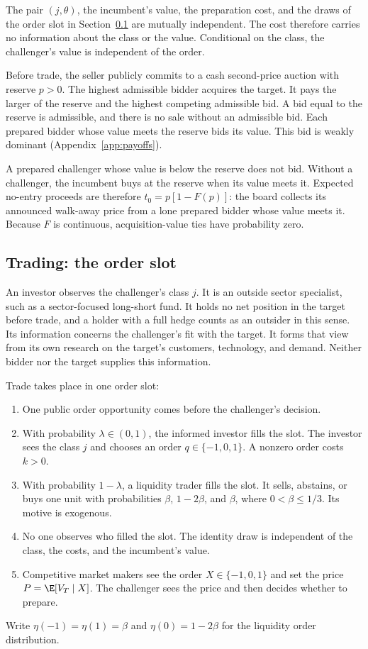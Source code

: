 The pair \((j,\theta)\), the incumbent's value, the preparation cost, and the draws of the order slot in
Section~\ref{sec:slot} are mutually independent. The cost therefore carries no information about the class or
the value. Conditional on the class, the challenger's value is independent of the order.

Before trade, the seller publicly commits to a cash second-price auction with reserve \(p>0\). The highest
admissible bidder acquires the target. It pays the larger of the reserve and the highest competing admissible
bid. A bid equal to the reserve is admissible, and there is no sale without an admissible bid. Each prepared
bidder whose value meets the reserve bids its value. This bid is weakly dominant (Appendix~\ref{app:payoffs}).

A prepared challenger whose value is below the reserve does not bid. Without a challenger, the incumbent buys
at the reserve when its value meets it. Expected no-entry proceeds are therefore \(t_0=p[1-F(p)]\): the board
collects its announced walk-away price from a lone prepared bidder whose value meets it. Because \(F\) is
continuous, acquisition-value ties have probability zero.

\subsection{Trading: the order slot}\label{sec:slot}

An investor observes the challenger's class \(j\). It is an outside sector specialist, such as a
sector-focused long-short fund. It holds no net position in the target before trade, and a holder with a full
hedge counts as an outsider in this sense. Its information concerns the challenger's fit with the target. It
forms that view from its own research on the target's customers, technology, and demand. Neither bidder nor the
target supplies this information.

Trade takes place in one order slot:
\begin{enumerate}[label=(\arabic*),leftmargin=2.5em]
\item One public order opportunity comes before the challenger's decision.
\item With probability \(\lambda\in(0,1)\), the informed investor fills the slot. The investor sees the class
\(j\) and chooses an order \(q\in\{-1,0,1\}\). A nonzero order costs \(k>0\).
\item With probability \(1-\lambda\), a liquidity trader fills the slot. It sells, abstains, or buys one unit
with probabilities \(\beta\), \(1-2\beta\), and \(\beta\), where \(0<\beta\le1/3\). Its motive is exogenous.
\item No one observes who filled the slot. The identity draw is independent of the class, the costs, and the
incumbent's value.
\item Competitive market makers see the order \(X\in\{-1,0,1\}\) and set the price
\(P=\E[V_T\mid X]\). The challenger sees the price and then decides whether to prepare.
\end{enumerate}
Write \(\eta(-1)=\eta(1)=\beta\) and \(\eta(0)=1-2\beta\) for the liquidity order distribution.


